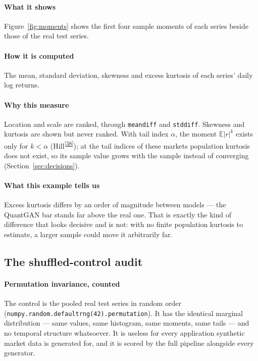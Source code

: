 \documentclass[11pt,a4paper]{article}
\makeatletter
\newcommand{\tcite}[1]{\textsuperscript{[\hyperlink{R:#1}{#1}]}}
\DeclareRobustCommand{\_}{\ifmmode\nfss@text{\textunderscore}\else\textunderscore\allowbreak\fi}
\newcommand{\E}{\mathbb{E}}
\makeatother
\begin{document}
\paragraph{What it shows} Figure~\ref{fig:moments} shows the first four sample moments of each series beside those of the real test series.

\paragraph{How it is computed} The mean, standard deviation, skewness and excess kurtosis of each series' daily log returns.

\paragraph{Why this measure} Location and scale are ranked, through \texttt{mean\_diff} and \texttt{std\_diff}. Skewness and kurtosis are shown but never ranked. With tail index $\alpha$, the moment $\E|r|^k$ exists only for $k<\alpha$ (Hill\tcite{38}); at the tail indices of these markets population kurtosis does not exist, so its sample value grows with the sample instead of converging (Section~\ref{sec:decisions}).

\paragraph{What this example tells us} Excess kurtosis differs by an order of magnitude between models --- the QuantGAN bar stands far above the real one. That is exactly the kind of difference that looks decisive and is not: with no finite population kurtosis to estimate, a larger sample could move it arbitrarily far.

\subsection{The shuffled-control audit}
\label{sec:audit}

\paragraph{Permutation invariance, counted} The control is the pooled real test series in random order (\texttt{numpy.random.default\_rng(42).permutation}). It has the identical marginal distribution --- same values, same histogram, same moments, same tails --- and no temporal structure whatsoever. It is useless for every application synthetic market data is generated for, and it is scored by the full pipeline alongside every generator.
\end{document}

